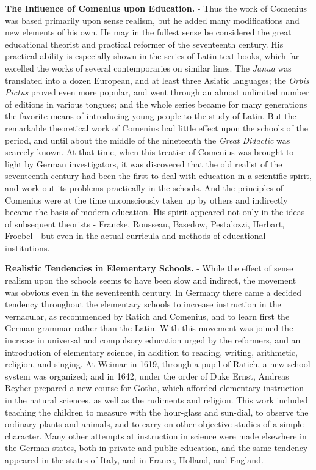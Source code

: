\documentclass[
]{book}
\begin{document}
\textbf{The Influence of Comenius upon Education.} - Thus the work of Comenius was based primarily upon sense realism, but he added many modifications and new elements of his own. He may in the fullest sense be considered the great educational theorist and practical reformer of the seventeenth century. His practical ability is especially shown in the series of Latin text-books, which far excelled the works of several contemporaries on similar lines. The \emph{Janua} was translated into a dozen European, and at least three Asiatic languages; the \emph{Orbis Pictus} proved even more popular, and went through an almost unlimited number of editions in various tongues; and the whole series became for many generations the favorite means of introducing young people to the study of Latin. But the remarkable theoretical work of Comenius had little effect upon the schools of the period, and until about the middle of the nineteenth the \emph{Great Didactic} was scarcely known. At that time, when this treatise of Comenius was brought to light by German investigators, it was discovered that the old realist of the seventeenth century had been the first to deal with education in a scientific spirit, and work out its problems practically in the schools. And the principles of Comenius were at the time unconsciously taken up by others and indirectly became the basis of modern education. His spirit appeared not only in the ideas of subsequent theorists - Francke, Rousseau, Basedow, Pestalozzi, Herbart, Froebel - but even in the actual curricula and methods of educational institutions.

\textbf{Realistic Tendencies in Elementary Schools.} - While the effect of sense realism upon the schools seems to have been slow and indirect, the movement was obvious even in the seventeenth century. In Germany there came a decided tendency throughout the elementary schools to increase instruction in the vernacular, as recommended by Ratich and Comenius, and to learn first the German grammar rather than the Latin. With this movement was joined the increase in universal and compulsory education urged by the reformers, and an introduction of elementary science, in addition to reading, writing, arithmetic, religion, and singing. At Weimar in 1619, through a pupil of Ratich, a new school system was organized; and in 1642, under the order of Duke Ernst, Andreas Reyher prepared a new course for Gotha, which afforded elementary instruction in the natural sciences, as well as the rudiments and religion. This work included teaching the children to measure with the hour-glass and sun-dial, to observe the ordinary plants and animals, and to carry on other objective studies of a simple character. Many other attempts at instruction in science were made elsewhere in the German states, both in private and public education, and the same tendency appeared in the states of Italy, and in France, Holland, and England.
\end{document}

